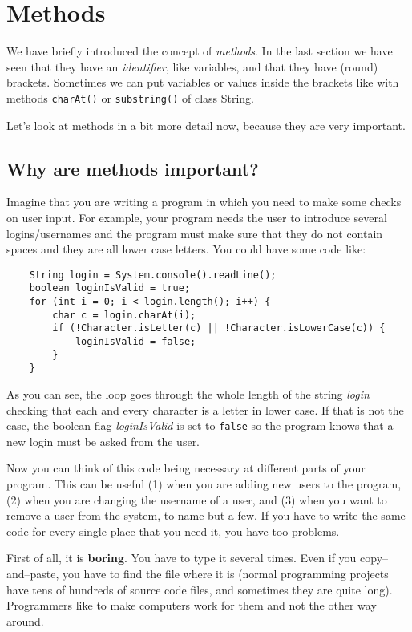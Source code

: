 
\section{Methods}
\label{sec:methods}

We have briefly introduced the concept of
\emph{methods}. In the last section we have seen that they have an
\emph{identifier}, like variables, and that they have (round)
brackets. Sometimes we can put variables or values inside the brackets
like with methods \verb+charAt()+ or \verb+substring()+ of class
String. 

Let's look at methods in a bit more detail now, because they are very
important. 

\subsection{Why are methods important?}

Imagine that you are writing a program in which you need to make some
checks on user input. For example, your program needs the user to
introduce several logins/usernames and the program must make sure that
they do not contain spaces and they are all lower case letters. You
could have some code like:

\begin{verbatim}
    String login = System.console().readLine();
    boolean loginIsValid = true;
    for (int i = 0; i < login.length(); i++) {
        char c = login.charAt(i);
        if (!Character.isLetter(c) || !Character.isLowerCase(c)) {
            loginIsValid = false;
        }
    }
\end{verbatim}

As you can see, the loop goes through the whole length of the string
\emph{login} checking that each and every character is a letter in
lower case. If that is not the case, the boolean flag
\emph{loginIsValid} is set to \verb+false+ so the program knows that a
new login must be asked from the user.

Now you can think of this code being necessary at different parts of
your program. This can be useful (1) when you are adding new users to the
program, (2) when you are changing the username of a user, and (3) when
you want to remove a user from the system, to name but a few. If you
have to write the same code for every single place that you need it,
you have too problems.

First of all, it is \textbf{boring}. You have to type it several
times. Even if you copy--and--paste, you have to find the file where
it is (normal programming projects have tens of hundreds of source
code files, and sometimes they are quite long). Programmers like to
make computers work for them and not the other way around.

